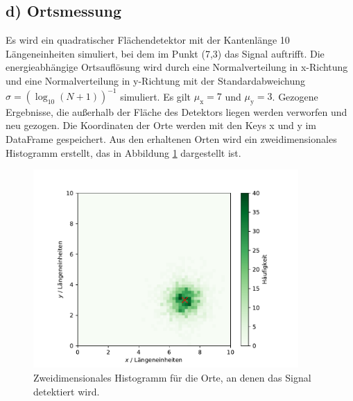 \documentclass[a4paper, 11pt]{article}
\begin{document}
\subsection*{d) Ortsmessung}
Es wird ein quadratischer Flächendetektor mit der Kantenlänge 10 Längeneinheiten
simuliert, bei dem im Punkt (7,3) das Signal auftrifft. Die energieabhängige
Ortsauflösung wird durch eine Normalverteilung in x-Richtung und eine Normalverteilung
in y-Richtung mit der Standardabweichung $\sigma = \left(\log_10(N+1)\right)^{-1}$
simuliert. Es gilt $\mu_\text{x}=7$ und $\mu_\text{y}=3$.
Gezogene Ergebnisse, die außerhalb der Fläche des Detektors liegen werden
verworfen und neu gezogen. Die Koordinaten der Orte werden mit den Keys x und y
im DataFrame gespeichert. Aus den erhaltenen Orten wird ein zweidimensionales
Histogramm erstellt, das in Abbildung \ref{fig:orte} dargestellt ist.
\begin{figure}
  \centering
  \includegraphics[width=0.9\textwidth]{../Orte.pdf}
  \caption{Zweidimensionales Histogramm für die Orte, an denen das Signal detektiert
  wird.}
  \label{fig:orte}
\end{figure}

\FloatBarrier
\end{document}
